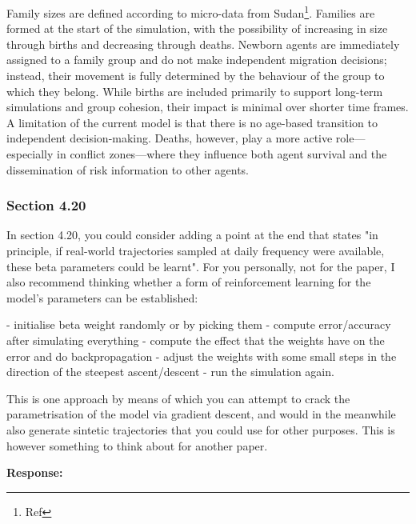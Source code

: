 \documentclass[11pt,a4paper]{article}
\begin{document}
\vspace{0.5cm}

\begin{updatebox}
Family sizes are defined according to micro-data from Sudan\footnote{Ref}. Families are formed at the start of the simulation, with the possibility of increasing in size through births and decreasing through deaths. Newborn agents are immediately assigned to a family group and do not make independent migration decisions; instead, their movement is fully determined by the behaviour of the group to which they belong. While births are included primarily to support long-term simulations and group cohesion, their impact is minimal over shorter time frames. A limitation of the current model is that there is no age-based transition to independent decision-making. Deaths, however, play a more active role—especially in conflict zones—where they influence both agent survival and the dissemination of risk information to other agents.
\end{updatebox}

\vspace{0.5cm}

\subsubsection*{Section 4.20}

\begin{reviewbox}
In section 4.20, you could consider adding a point at the end that states "in principle, if real-world trajectories sampled at daily frequency were available, these beta parameters could be learnt". For you personally, not for the paper, I also recommend thinking whether a form of reinforcement learning for the model's parameters can be established:

- initialise beta weight randomly or by picking them
- compute error/accuracy after simulating everything
- compute the effect that the weights have on the error and do backpropagation
- adjust the weights with some small steps in the direction of the steepest ascent/descent
- run the simulation again.

This is one approach by means of which you can attempt to crack the parametrisation of the model via gradient descent, and would in the meanwhile also generate sintetic trajectories that you could use for other purposes. This is however something to think about for another paper.
\end{reviewbox}

\textbf{Response:}
\end{document}
